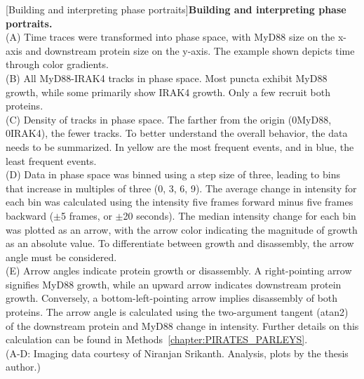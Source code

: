 \begin{centering}
\captionsetup{parbox=none}
[Building and interpreting phase portraits]{\textbf{Building and interpreting phase portraits.} 
\vspace{1em}
\\
(A) Time traces were transformed into phase space, with MyD88 size on the x-axis and downstream protein size on the y-axis. The example shown depicts time through color gradients.
\vspace{1em}
\\
(B) All MyD88-IRAK4 tracks in phase space. Most puncta exhibit MyD88 growth, while some primarily show IRAK4 growth. Only a few recruit both proteins.
\vspace{1em}
\\
(C) Density of tracks in phase space. The farther from the origin (0\times MyD88, 0\times IRAK4), the fewer tracks. To better understand the overall behavior, the data needs to be summarized. In yellow are the most frequent events, and in blue, the least frequent events.
\vspace{1em}
\\
(D) Data in phase space was binned using a step size of three, leading to bins that increase in multiples of three (0\times, 3\times, 6\times, 9\times). The average change in intensity for each bin was calculated using the intensity five frames forward minus five frames backward ($\pm$5 frames, or $\pm$20 seconds). The median intensity change for each bin was plotted as an arrow, with the arrow color indicating the magnitude of growth as an absolute value. To differentiate between growth and disassembly, the arrow angle must be considered.
\vspace{1em}
\\
(E) Arrow angles indicate protein growth or disassembly. A right-pointing arrow signifies MyD88 growth, while an upward arrow indicates downstream protein growth. Conversely, a bottom-left-pointing arrow implies disassembly of both proteins. The arrow angle is calculated using the two-argument tangent (atan2) of the downstream protein and MyD88 change in intensity. Further details on this calculation can be found in Methods~\ref{chapter:PIRATES_PARLEYS}.
\vspace{1em}
\\
(A-D: Imaging data courtesy of Niranjan Srikanth. Analysis, plots by the thesis author.)}
\label{p2:3a}
\end{centering}

